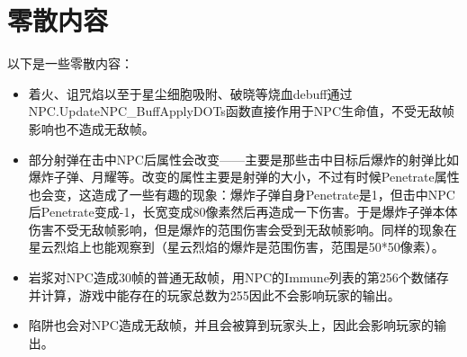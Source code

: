 \section{零散内容}
以下是一些零散内容：
\begin{itemize}
\item 着火、诅咒焰以至于星尘细胞吸附、破晓等烧血debuff通过NPC.UpdateNPC\_Buff\allowbreak ApplyDOTs函数直接作用于NPC生命值，不受无敌帧影响也不造成无敌帧。
\item 部分射弹在击中NPC后属性会改变——主要是那些击中目标后爆炸的射弹比如爆炸子弹、月耀等。改变的属性主要是射弹的大小，不过有时候Penetrate属性也会变，这造成了一些有趣的现象：爆炸子弹自身Penetrate是1，但击中NPC后Penetrate变成-1，长宽变成80像素然后再造成一下伤害。于是爆炸子弹本体伤害不受无敌帧影响，但是爆炸的范围伤害会受到无敌帧影响。同样的现象在星云烈焰上也能观察到（星云烈焰的爆炸是范围伤害，范围是50*50像素）。
\item 岩浆对NPC造成30帧的普通无敌帧，用NPC的Immune列表的第256个数储存并计算，游戏中能存在的玩家总数为255因此不会影响玩家的输出。
\item 陷阱也会对NPC造成无敌帧，并且会被算到玩家头上，因此会影响玩家的输出。
\end{itemize}